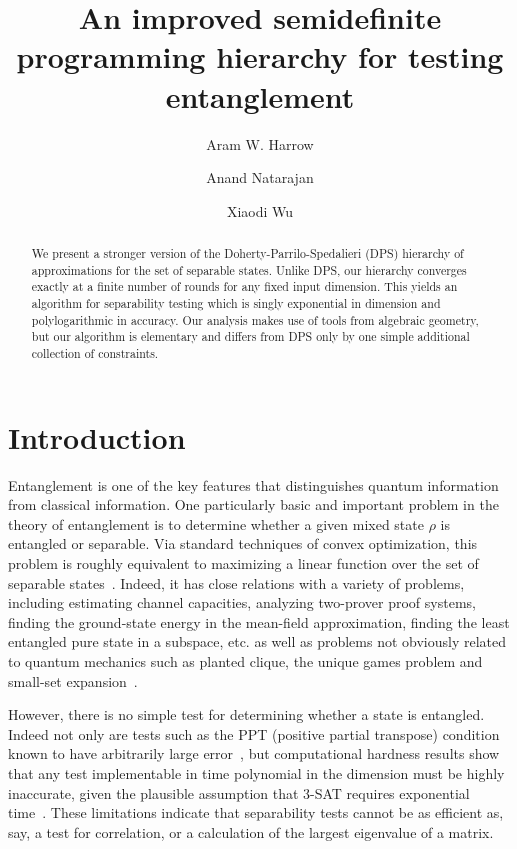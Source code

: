\documentclass[aps,pra,notitlepage,preprintnumbers,11pt,tightenlines]{revtex4-1}
\begin{document}
\title{An improved semidefinite programming hierarchy for testing entanglement}

\author{Aram W. Harrow}
\author{Anand Natarajan}
\author{Xiaodi Wu}

\begin{abstract}

  We present a stronger version of the Doherty-Parrilo-Spedalieri (DPS) hierarchy of approximations for the set of separable states.  Unlike DPS, our hierarchy converges exactly at a finite number of rounds for any fixed input dimension.  This yields an algorithm for separability testing which is singly exponential in dimension and polylogarithmic in accuracy.  Our analysis makes use of tools from algebraic geometry, but our algorithm is elementary and differs from DPS only by one simple additional collection of constraints.

\end{abstract}

\maketitle

\section{Introduction}\label{sec:intro}

Entanglement is one of the key features that distinguishes quantum
information from classical information.  One particularly basic and
important problem in the theory of entanglement is to determine
whether a given mixed state $\rho$ is entangled or separable.  Via
standard techniques of convex optimization, this problem is roughly
equivalent to maximizing a linear function over the set of separable
states~\cite{gls:1993,liu:2007}.  Indeed, it has close relations with a variety of
problems, including estimating channel capacities, analyzing
two-prover proof systems, finding the ground-state energy in the
mean-field approximation, finding the least entangled pure state in a
subspace, etc. as well as problems not obviously related to quantum
mechanics such as planted clique, the unique games problem and
small-set expansion~\cite{HM13}.

However, there is no simple test for determining whether a state is
entangled.  Indeed not only are tests such as the PPT (positive
partial transpose) condition known to have arbitrarily large
error~\cite{BeigiS10}, but computational hardness results show that
any test implementable in time polynomial in the dimension must be
highly inaccurate, given the plausible assumption that 3-SAT requires
exponential time~\cite{HM13,GallNN11}.
These limitations indicate that separability tests cannot be as
efficient as, say, a test for correlation, or a calculation of the
largest eigenvalue of a matrix.  
\end{document}
